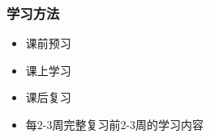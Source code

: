 \documentclass[Prob-All.tex]{subfiles}
\begin{document}


\begin{frame}
	\frametitle{学习方法}
	\begin{itemize}[<+-|alert@+>]
		\item 课前预习
		\item 课上学习
		\item 课后复习
		\item 每2-3周完整复习前2-3周的学习内容
	\end{itemize}
\end{frame}
\end{document}
